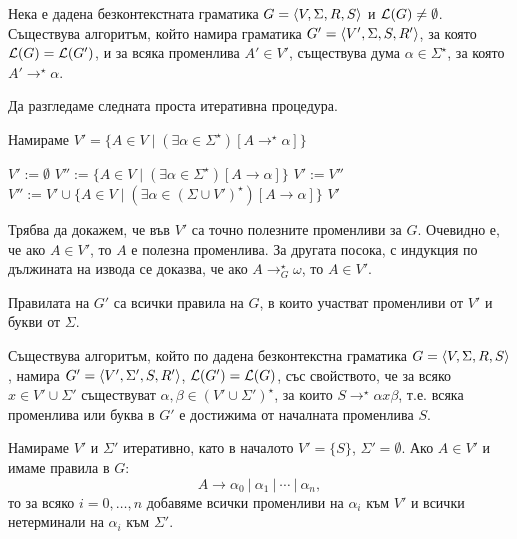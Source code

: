 \begin{lemma}
  \label{lem:useless1}
  Нека е дадена безконтекстната граматика $G = \langle{V,\Sigma,R,S}\rangle$ и $\mathcal{L}(G) \neq \emptyset$.
  Съществува алгоритъм, който намира граматика $G' = \langle{V',\Sigma,S,R'}\rangle$, за която 
  $\mathcal{L}(G) = \mathcal{L}(G')$, и за всяка променлива $A' \in V'$, съществува дума $\alpha \in \Sigma^\star$,
  за която $A' \to^\star \alpha$.
\end{lemma}
\begin{hint}
  Да разгледаме следната проста итеративна процедура.
  \begin{algorithm}[H]
    \caption{Намираме $V' = \{A \in V\mid (\exists \alpha \in \Sigma^\star)[A \to^\star \alpha]\}$}
    \label{alg:useless}
    \begin{algorithmic}[1]
      \State $V' := \emptyset$
      \State $V'' := \{A \in V \mid (\exists \alpha \in \Sigma^\star)[A \to \alpha]\}$
      \State $V' := V''$
      \State $V'' := V' \cup \{A \in V \mid (\exists \alpha \in (\Sigma \cup V')^\star)[A \to \alpha]\}$
      \EndWhile
      \State \Return $V'$
    \end{algorithmic}
  \end{algorithm}
  Трябва да докажем, че във $V'$ са точно полезните променливи за $G$.
  Очевидно е, че ако $A \in V'$, то $A$ е полезна променлива.
  За другата посока, с индукция по дължината на извода се доказва, че ако $A \to^\star_G \omega$,
  то $A \in V'$.
  
  Правилата на $G'$ са всички правила на $G$, в които участват променливи от $V'$ и букви от $\Sigma$.
\end{hint}

\begin{lemma}
  \label{lem:useless2}
  Съществува алгоритъм, който по дадена безконтекстна граматика $G = \langle{V,\Sigma,R,S}\rangle$, намира $G' = \langle{V',\Sigma',S,R'}\rangle$, $\mathcal{L}(G') = \mathcal{L}(G)$,
  със свойството, че за всяко $x \in V' \cup \Sigma'$ съществуват $\alpha, \beta \in (V'\cup\Sigma')^\star$,
  за които $S \to^\star \alpha x \beta$,
  т.е. всяка променлива или буква в $G'$ е достижима от началната променлива $S$.
\end{lemma}
\begin{hint}
  Намираме $V'$ и $\Sigma'$ итеративно, като в началото $V' = \{S\}$, $\Sigma' = \emptyset$.
  Ако $A \in V'$ и имаме правила в $G$:
  \[A \to \alpha_0\ |\ \alpha_1\ |\ \cdots\ |\ \alpha_n,\]
  то за всяко $i = 0,\dots,n$ добавяме всички променливи на $\alpha_i$ към $V'$ и всички нетерминали на $\alpha_i$ към $\Sigma'$.
\end{hint}


